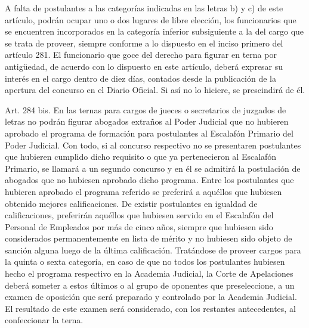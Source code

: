     A falta de postulantes a las categorías indicadas en las letras b) y c) de este artículo, podrán ocupar uno o dos lugares de libre elección, los funcionarios que se encuentren incorporados en la categoría inferior subsiguiente a la del cargo que se trata de proveer, siempre conforme a lo dispuesto en el inciso primero del artículo 281.
    El funcionario que goce del derecho para figurar en terna por antigüedad, de acuerdo con lo dispuesto en este artículo, deberá expresar su interés en el cargo dentro de diez días, contados desde la publicación de la apertura del concurso en el Diario Oficial. Si así no lo hiciere, se prescindirá de él.



    Art. 284 bis. En las ternas para cargos de jueces o secretarios de juzgados de letras no podrán figurar abogados extraños al Poder Judicial que no hubieren aprobado el programa de formación para postulantes al Escalafón Primario del Poder Judicial. Con todo, si al concurso respectivo no se presentaren postulantes que hubieren cumplido dicho requisito o que ya pertenecieron al Escalafón Primario, se llamará a un segundo concurso y en él se admitirá la postulación de abogados que no hubiesen aprobado dicho programa.
    Entre los postulantes que hubieren aprobado el programa referido se preferirá a aquéllos que hubiesen obtenido mejores calificaciones. De existir postulantes en igualdad de calificaciones, preferirán aquéllos que hubiesen servido en el Escalafón del Personal de Empleados por más de cinco años, siempre que hubiesen sido considerados permanentemente en lista de mérito y no hubiesen sido objeto de sanción alguna luego de la última calificación.
    Tratándose de proveer cargos para la quinta o sexta categoría, en caso de que no todos los postulantes hubiesen hecho el programa respectivo en la Academia Judicial, la Corte de Apelaciones deberá someter a estos últimos o al grupo de oponentes que preseleccione, a un examen de oposición que será preparado y controlado por la Academia Judicial. El resultado de este examen será considerado, con los restantes antecedentes, al confeccionar la terna.

